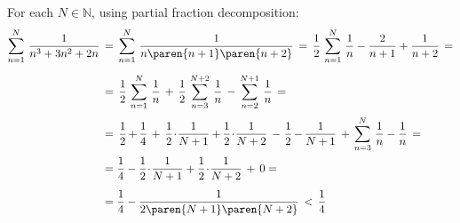 For each $N \in \mathbb{N}$, using partial fraction decomposition:
\begin{equation*}
\begin{split}
  \sum\limits_{n=1}^{N} {\, \frac{1}{n^3 + 3 n^2 + 2n}} \,
  &= \, \sum\limits_{n=1}^{N} {\, \frac{1}{n \paren{n + 1} \paren{n + 2}}} \,
   = \, \frac{1}{2} \, \sum\limits_{n=1}^{N} {\, \frac{1}{n} - \frac{2}{n + 1} + \frac{1}{n + 2}} \, = \\[1.35ex]
  &= \, \frac{1}{2} \, \sum\limits_{n=1}^{N} {\, \frac{1}{n}}
     \, + \, \frac{1}{2} \, \sum\limits_{n=3}^{N + 2} {\, \frac{1}{n}}
     \, - \, \sum\limits_{n=2}^{N + 1} {\, \frac{1}{n}} \, = \\[0.6ex]
  &= \, \frac{1}{2} \mspace{-1.2mu} + \mspace{-1.2mu} \frac{1}{4}
     \, + \, \frac{1}{2} \! \cdot \! \frac{1}{N + 1} \mspace{-0.6mu}
     + \mspace{-0.6mu} \frac{1}{2} \! \cdot \! \frac{1}{N + 2}
     \, - \mspace{1.5mu} \frac{1}{2} \mspace{-1.2mu} - \mspace{-1.2mu} \frac{1}{N + 1}
     \, + \, \sum\limits_{n=3}^{N} {\, \frac{1}{n} - \frac{1}{n}} \, = \\[0.3ex]
  &= \frac{1}{4}
     - \frac{1}{2} \! \cdot \! \frac{1}{N + 1}
     + \frac{1}{2} \! \cdot \! \frac{1}{N + 2}
     \, + \, 0 = \\[1.1ex]
  &= \frac{1}{4} - \frac{1}{2 \paren{N + 1} \paren{N + 2}} \,
   < \, \frac{1}{4}
\end{split}
\end{equation*}
